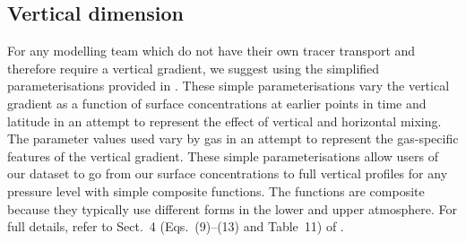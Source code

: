 \subsection{Vertical dimension}
\label{ssec:methods-vertical}

For any modelling team which do not have their own tracer transport and therefore require a vertical gradient,
we suggest using the simplified parameterisations provided in \citet{meinshausen_historical-ghgs_2017}.
These simple parameterisations vary the vertical gradient as a function of surface concentrations at earlier points in time and latitude
in an attempt to represent the effect of vertical and horizontal mixing.
The parameter values used vary by gas in an attempt to represent the gas-specific features of the vertical gradient.
These simple parameterisations allow users of our dataset to go from our surface concentrations
to full vertical profiles for any pressure level with simple composite functions.
The functions are composite because they typically use different forms in the lower and upper atmosphere.
For full details, refer to Sect.~4 (Eqs.~(9)--(13) and Table~11) of \citet{meinshausen_historical-ghgs_2017}.

\clearpage
